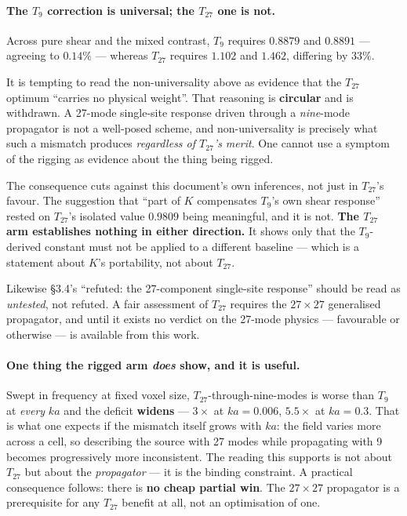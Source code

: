 \documentclass[11pt,a4paper]{article}
\newcommand{\Kren}{K}
\begin{document}
\paragraph{The $T_9$ correction is universal; the $T_{27}$ one is not.} Across
pure shear and the mixed contrast, $T_9$ requires $0.8879$ and $0.8891$ ---
agreeing to $0.14\%$ --- whereas $T_{27}$ requires $1.102$ and $1.462$, differing
by $33\%$.

\begin{tcolorbox}[colback=red!4,colframe=red!45!black,
  title={The $T_{27}$ comparison is rigged, and cannot be used either way}]
It is tempting to read the non-universality above as evidence that the $T_{27}$
optimum ``carries no physical weight''. That reasoning is \textbf{circular} and
is withdrawn. A 27-mode single-site response driven through a \emph{nine}-mode
propagator is not a well-posed scheme, and non-universality is precisely what
such a mismatch produces \emph{regardless of $T_{27}$'s merit}. One cannot use a
symptom of the rigging as evidence about the thing being rigged.

The consequence cuts against this document's own inferences, not just in
$T_{27}$'s favour. The suggestion that ``part of $\Kren$ compensates $T_9$'s own
shear response'' rested on $T_{27}$'s isolated value $0.9809$ being meaningful,
and it is not. \textbf{The $T_{27}$ arm establishes nothing in either
direction.} It shows only that the $T_9$-derived constant must not be applied to
a different baseline --- which is a statement about $\Kren$'s portability, not
about $T_{27}$.

Likewise \S3.4's ``refuted: the 27-component single-site response'' should be read
as \emph{untested}, not refuted. A fair assessment of $T_{27}$ requires the
$27\times27$ generalised propagator, and until it exists no verdict on the
27-mode physics --- favourable or otherwise --- is available from this work.
\end{tcolorbox}

\paragraph{One thing the rigged arm \emph{does} show, and it is useful.} Swept in
frequency at fixed voxel size, $T_{27}$-through-nine-modes is worse than $T_9$ at
\emph{every} $ka$ and the deficit \textbf{widens} --- $3\times$ at $ka = 0.006$,
$5.5\times$ at $ka = 0.3$. That is what one expects if the mismatch itself grows
with $ka$: the field varies more across a cell, so describing the source with 27
modes while propagating with 9 becomes progressively more inconsistent. The
reading this supports is not about $T_{27}$ but about the \emph{propagator} ---
it is the binding constraint. A practical consequence follows: there is \textbf{no
cheap partial win}. The $27\times27$ propagator is a prerequisite for any
$T_{27}$ benefit at all, not an optimisation of one.
\end{document}
